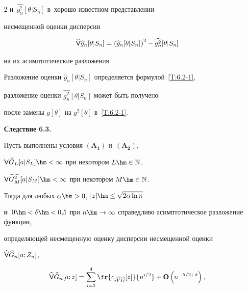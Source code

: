 \begin{multicols}{2}
  и~$\widehat{g^2_n}[\theta|S_n]$ в~хорошо известном представлении


 несмещенной оценки дисперсии


 \begin{equation*}


 \widehat{\Vp} \widehat{g}_n[\theta|S_n]=


 \left(\widehat{g}_n[\theta|S_n]\right)^2-\widehat{g^2_n}[\theta|S_n]




 \end{equation*}


  на их асимптотические разложения.


  Разложение оценки $\widehat{g}_n[\theta|S_n]$ определяется формулой~\eqref{T:6.2-1},


  разложение оценки $\widehat{g^2_n}[\theta|S_n]$ может быть получено


  после замены $g[\theta]$ на $g^2[\theta]$ в~\eqref{T:6.2-1}.





  \smallskip





\noindent


\textbf{Следствие 6.3.}\


Пусть выполнены условия $\mathbf{(A_1)}$ и~$\mathbf{(A_2)}$,


 $\Vp \widehat{G}_L[a|S_L]\hm<\infty$ при некотором $L\hm\in\mathbb{N}$,


 ${\sf V} \widehat{G^2_M}[a|S_M]\hm<\infty$ при некотором $M\hm\in\mathbb{N}$.


 Тогда для любых $\alpha\hm>0$, $|z|\hm\le \sqrt{2\alpha\ln n}$


 и~$0\hm<\delta\hm<0{,}5$ при $n\hm\to\infty$ справедливо асимптотическое разложение функции,


 определяющей несмещенную оценку дисперсии несмещенной оценки


 $\widehat{{\sf V}}\widehat{G}_n[a;Z_n]$,


 \begin{equation*}


 \widehat{\Vp}\widehat{G}_n[a;z]=


 \sum\limits_{i=2}^4 \fr{c_{i\widehat{V}\widehat{G}}[z]}{n^{i/2}}+\Op\left( n^{-5/2+\delta}\right),




 \end{equation*}



\end{multicols}

